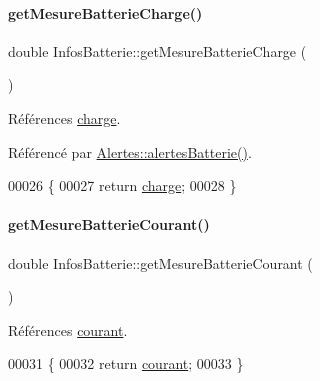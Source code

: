 \paragraph{\texorpdfstring{get\+Mesure\+Batterie\+Charge()}{getMesureBatterieCharge()}}
{\footnotesize\ttfamily double Infos\+Batterie\+::get\+Mesure\+Batterie\+Charge (\begin{DoxyParamCaption}{ }\end{DoxyParamCaption})}



Références \hyperlink{class_infos_batterie_af3ad72cdbbf13f2dec6d81f078a2c0d2}{charge}.



Référencé par \hyperlink{class_alertes_ad708a4b800d56c1439b65d12a3c6b027}{Alertes\+::alertes\+Batterie()}.


\begin{DoxyCode}
00026 \{
00027     \textcolor{keywordflow}{return} \hyperlink{class_infos_batterie_af3ad72cdbbf13f2dec6d81f078a2c0d2}{charge};
00028 \}
\end{DoxyCode}
\mbox{\label{class_infos_batterie_a17a55f19c132026091217c243bf402c0}} 
\paragraph{\texorpdfstring{get\+Mesure\+Batterie\+Courant()}{getMesureBatterieCourant()}}
{\footnotesize\ttfamily double Infos\+Batterie\+::get\+Mesure\+Batterie\+Courant (\begin{DoxyParamCaption}{ }\end{DoxyParamCaption})}



Références \hyperlink{class_infos_batterie_a417f025b2ccddea7d28f80df4413945a}{courant}.


\begin{DoxyCode}
00031 \{
00032     \textcolor{keywordflow}{return} \hyperlink{class_infos_batterie_a417f025b2ccddea7d28f80df4413945a}{courant};
00033 \}
\end{DoxyCode}
\mbox{\label{class_infos_batterie_a470b96c2fe1fab6a187c6d0997bd76a8}} 
